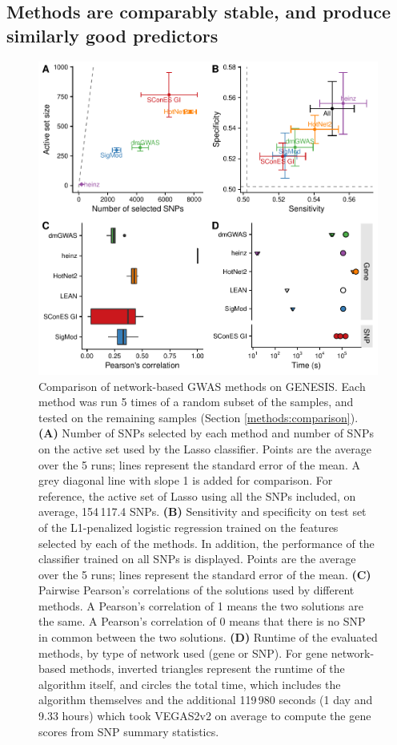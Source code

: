 \documentclass[twocolumn, 10pt]{article}
\begin{document}
\subsection{Methods are comparably stable, and produce similarly good predictors}

\begin{figure}[htbp]
\centering
\includegraphics[width=.8\linewidth]{./figures/figure_4.pdf}
\caption{\label{fig:benchmark}
Comparison of network-based GWAS methods on GENESIS. Each method was run 5 times of a random subset of the samples, and tested on the remaining samples (Section \ref{methods:comparison}). \textbf{(A)} Number of SNPs selected by each method and number of SNPs on the active set used by the Lasso classifier. Points are the average over the 5 runs; lines represent the standard error of the mean. A grey diagonal line with slope 1 is added for comparison. For reference, the active set of Lasso using all the SNPs included, on average, 154\,117.4 SNPs. \textbf{(B)} Sensitivity and specificity on test set of the L1-penalized logistic regression trained on the features selected by each of the methods. In addition, the performance of the classifier trained on all SNPs is displayed. Points are the average over the 5 runs; lines represent the standard error of the mean. \textbf{(C)} Pairwise Pearson's correlations of the solutions used by different methods. A Pearson's correlation of 1 means the two solutions are the same. A Pearson's correlation of 0 means that there is no SNP in common between the two solutions. \textbf{(D)} Runtime of the evaluated methods, by type of network used (gene or SNP). For gene network-based methods, inverted triangles represent the runtime of the algorithm itself, and circles the total time, which includes the algorithm themselves and the additional 119\,980 seconds (1 day and 9.33 hours) which took VEGAS2v2 on average to compute the gene scores from SNP summary statistics.}
\end{figure}
\end{document}
